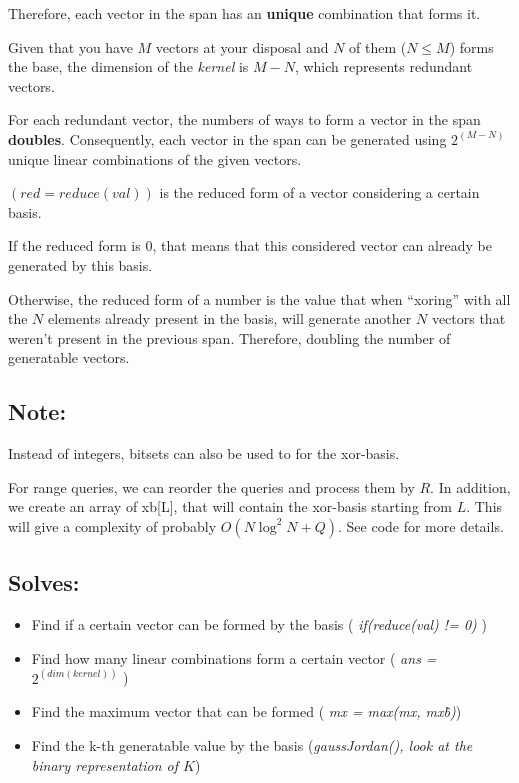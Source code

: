Therefore, each vector in the span has an \textbf{unique} combination that forms it. 

Given that you have $M$ vectors at your disposal and $N$ of them ($N \leq M$) forms the base,
the dimension of the \textit{kernel} is $M-N$, which represents redundant vectors.

For each redundant vector, the numbers of ways to form a vector in the span \textbf{doubles}.
Consequently, each vector in the span 
can be generated using $2^(M-N)$ unique linear combinations of the given vectors. 

$(red = reduce(val))$ is the reduced form of a vector considering a certain basis.

If the reduced form is $0$, that means that this considered vector can already be generated by this basis.

Otherwise, the reduced form of a number is the value that when ``xoring'' with all the $N$ elements 
already present in the basis, will generate another $N$ vectors that weren't present in the previous span.
Therefore, doubling the number of generatable vectors.

\subsection{Note:}

Instead of integers, bitsets can also be used to for the xor-basis.

For range queries, we can reorder the queries and process them by $R$. In addition, we create
an array of xb[L], that will contain the xor-basis starting from $L$. This will give a complexity
of probably $O(N \log^2{N} + Q)$. See code for more details.

\subsection{Solves:}

\begin{itemize}
	\item Find if a certain vector can be formed by the basis ( \textit{ if(reduce(val) != 0) } )
	\item Find how many linear combinations form a certain vector ( \textit{ans = $2^(dim(kernel))$} )
	\item Find the maximum vector that can be formed ( \textit{mx = max(mx, mx\^b)})
	\item Find the k-th generatable value by the basis (\textit{gaussJordan(), look at the binary representation of $K$})
\end{itemize}

